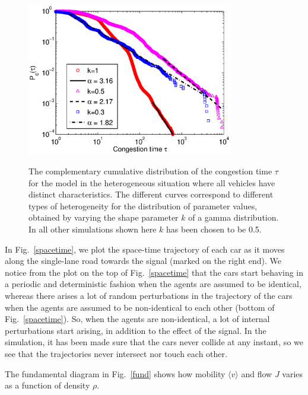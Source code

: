 \documentclass[conference]{IEEEtran}
\begin{document}
\begin{figure}
{    \includegraphics[width=9.0cm, angle=0]{figures/fig7.eps}}
\caption{The complementary cumulative distribution of the congestion
time $\tau$ for the model in the heterogeneous situation where all 
vehicles have distinct characteristics. The different curves
correspond to different types of heterogeneity for the distribution of
parameter values, obtained by varying the shape parameter $k$ of a
gamma distribution. In all other simulations shown here $k$ has been
chosen to be 0.5.}
    \label{power_law_gam}
\end{figure}



In Fig.~\ref{spacetime}, we plot the space-time trajectory of each car
as it moves along the single-lane road towards the signal (marked on
the right end). We notice from the plot on the top of
Fig.~\ref{spacetime} that the cars start behaving in a periodic and
deterministic fashion when the agents are assumed to be identical,
whereas there arises a lot of random perturbations in the trajectory
of the cars when the agents are assumed to be non-identical to each
other (bottom of Fig.~\ref{spacetime}). So, when the agents are non-identical, a lot of internal perturbations start arising, in addition to the effect of the signal. In the simulation, it has been made sure that the cars never collide at any instant, so we see that the trajectories never intersect nor touch each other. %




The fundamental diagram in Fig.~\ref{fund} shows how mobility $\langle v \rangle$ and flow $J$ varies as a function of density $\rho$.
\end{document}
